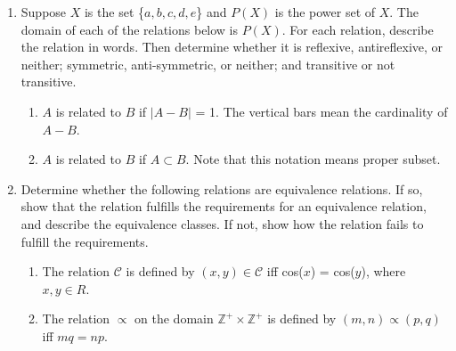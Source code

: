 \documentclass{article}
\newcommand{\Z}{\mathbb{Z}}
\begin{document}
\begin{enumerate}
\begin{itemize}
\end{itemize}
\item Suppose $X$ is the set \{$a,b,c,d,e$\} and $P(X)$ is the power set of $X$. 
The domain of each of the relations below is $P(X)$. 
For each relation, describe the relation in words. Then determine whether it is 
reflexive, antireflexive, or neither; symmetric, anti-symmetric, or neither; and 
transitive or not transitive.

\begin{enumerate}
    \item $A$ is related to $B$ if $\lvert A-B \rvert$ = 1. The 
    vertical bars mean the cardinality of $A - B$.
    \item $A$ is related to $B$ if $A \subset B$. Note 
    that this notation means proper subset.
\end{enumerate}


\item Determine whether the following relations are equivalence relations. 
If so, show that the relation fulfills the requirements for an equivalence relation, 
and describe the equivalence classes. If not, show how the relation fails to fulfill 
the requirements.

\begin{enumerate}
    \item The relation $\mathcal{C}$ is defined by $(x,y)\in \mathcal{C}$ iff cos($x$) = cos($y$), where $x,y \in R$.
    \item The relation $\varpropto$ on the domain $\Z^+\times\Z^+$ is defined by $(m,n) \varpropto (p,q)$ iff $mq = np$.
\end{enumerate}

\end{enumerate}
\end{document}
